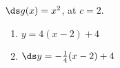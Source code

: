 {$\ds g(x) = x^2$, at $c=2$.
}
{\begin{enumerate}
\item		$y = 4(x-2)+4$
\item		$\ds y = -\frac{1}{4}(x-2)+4$
\end{enumerate}
}
